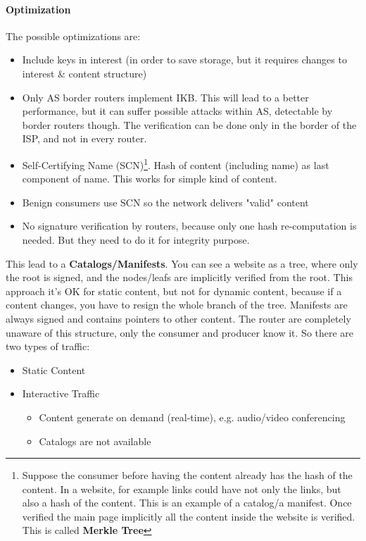 \paragraph*{Optimization} The possible optimizations are:
\begin{itemize}
  \item Include keys in interest (in order to save storage, but it requires
changes to interest \& content structure)
  \item Only AS border routers implement IKB. This will lead to a better
performance, but it can suffer possible attacks within AS, detectable by
border routers though. The verification can be done only in the border of the
ISP, and not in every router.
  \item Self-Certifying Name (SCN)\footnote{Suppose the consumer before having
the content already has the hash of the content. In a website, for example
links could have not only the links, but also a hash of the content. This is an
example of a catalog/a manifest. Once verified the main page implicitly all the
content inside the website is verified. This is called \textbf{Merkle Tree}}.
Hash of content (including name) as last component of name. This works for
simple kind of content.
  \item Benign consumers use SCN so the network delivers "valid" content
  \item No signature verification by routers, because only one hash
re-computation is needed. But they need to do it for integrity purpose.
\end{itemize}

This lead to a \textbf{Catalogs/Manifests}. You can see a website as a tree,
where only the root is signed, and the nodes/leafs are implicitly verified from
the root. This approach it's OK for static content, but not for dynamic
content, because if a content changes, you have to resign the whole branch of
the tree.
Manifests are always signed and contains pointers to other content. The router
are completely unaware of this structure, only the consumer and producer know
it.
So there are two types of traffic:
\begin{itemize}
  \item Static Content
  \item Interactive Traffic
  \begin{itemize}
    \item Content generate on demand (real-time), e.g. audio/video conferencing
    \item Catalogs are not available
  \end{itemize}
\end{itemize}

